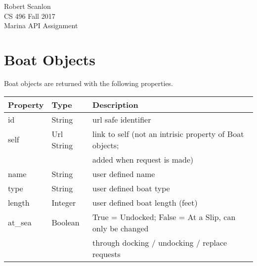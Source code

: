 \documentclass{article}
\begin{document}
\noindent
Robert Scanlon \\
CS 496 Fall 2017 \\
Marina API Assignment 

\section*{Boat Objects}
Boat objects are returned with the following properties. \\
\begin{tabular}{| l | l | l |}
	\hline
	\textbf{Property}     & \textbf{Type}   & \textbf{Description} \\
	\hline
	id                    & String          & url safe identifier \\
	\hline
	self                  & Url String      & link to self (not an intrisic property of Boat objects; \\
	                      &                 & added when request is made) \\
	\hline
	name		      & String          & user defined name \\
	\hline
	type	              & String          & user defined boat type \\
	\hline
	length                & Integer         & user defined boat length (feet) \\
	\hline
	at\_sea	              & Boolean         & True = Undocked; False = At a Slip, can only be changed \\
	                      &                 & through docking / undocking / replace requests \\
	\hline
\end{tabular}
\end{document}

